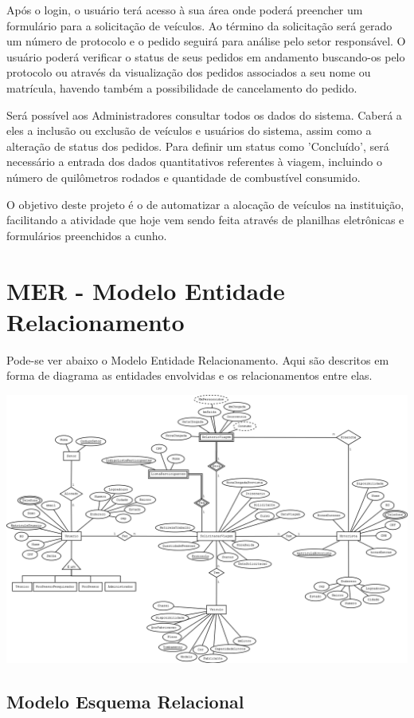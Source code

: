 \documentclass[11pt]{article}
\begin{document}
Após o login, o usuário terá acesso à sua área onde poderá preencher um formulário para a solicitação de veículos. Ao término da solicitação será gerado um número de protocolo e o pedido seguirá para análise pelo setor responsável. O usuário poderá verificar o status de seus pedidos em andamento buscando-os pelo protocolo ou através da visualização dos pedidos associados a seu nome ou matrícula, havendo também a possibilidade de cancelamento do pedido.

Será possível aos Administradores consultar todos os dados do sistema. Caberá a eles a inclusão ou exclusão de veículos e usuários do sistema, assim como a alteração de status dos pedidos. Para definir um status como 'Concluído', será necessário a entrada dos dados quantitativos referentes à viagem, incluindo o número de quilômetros rodados e quantidade de combustível consumido.

O objetivo deste projeto é o de automatizar a alocação de veículos na instituição, facilitando a atividade que hoje vem sendo feita através de planilhas eletrônicas e formulários preenchidos a cunho.

\section{MER - Modelo Entidade Relacionamento}
Pode-se ver abaixo o Modelo Entidade Relacionamento. Aqui são descritos em forma de diagrama as entidades envolvidas e os relacionamentos entre elas.
\begin{center}
\includegraphics[scale=0.3]{esquema.png}
\end{center}   

\subsection{Modelo Esquema Relacional}
\end{document}
